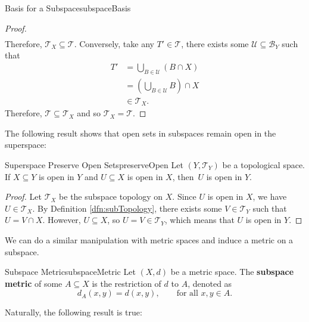 \documentclass[math]{amznotes}
\theoremstyle{remark}
\begin{document}
\begin{probox}{Basis for a Subspace}{subspaceBasis}
\begin{proof}
\begin{align*}
        \end{align*}
        Therefore, $\mathcal{T}_X \subseteq \mathcal{T}$. Conversely, take any $T' \in \mathcal{T}$, there exists some $\mathcal{U} \subseteq \mathcal{B}_Y$ such that
        \begin{align*}
            T' & = \bigcup_{B \in \mathcal{U}}\left(B \cap X\right) \\
            & = \left(\bigcup_{B \in \mathcal{U}}B\right) \cap X \\
            & \in \mathcal{T}_X.
        \end{align*}
        Therefore, $\mathcal{T} \subseteq \mathcal{T}_X$ and so $\mathcal{T}_X = \mathcal{T}$.
    \end{proof}
\end{probox}
The following result shows that open sets in subspaces remain open in the superspace:
\begin{probox}{Superspace Preserve Open Sets}{preserveOpen}
    Let $\left(Y, \mathcal{T}_Y\right)$ be a topological space. If $X \subseteq Y$ is open in $Y$ and $U \subseteq X$ is open in $X$, then~$U$ is open in $Y$.
    \tcblower
    \begin{proof}
        Let $\mathcal{T}_X$ be the subspace topology on $X$. Since $U$ is open in $X$, we have $U \in \mathcal{T}_X$. By Definition \ref{dfn:subTopology}, there exists some $V \in \mathcal{T}_Y$ such that $U = V \cap X$. However, $U \subseteq X$, so $U = V \in \mathcal{T}_Y$, which means that $U$ is open in $Y$.
    \end{proof}
\end{probox}
We can do a similar manipulation with metric spaces and induce a metric on a subspace.
\begin{dfnbox}{Subspace Metric}{subspaceMetric}
    Let $\left(X, d\right)$ be a metric space. The {\color{red} \textbf{subspace metric}} of some $A \subseteq X$ is the restriction of $d$ to $A$, denoted as 
    \begin{equation*}
        d_A\left(x, y\right) = d\left(x, y\right), \qquad \textrm{for all } x, y \in A.
    \end{equation*}
\end{dfnbox}
Naturally, the following result is true:
\end{document}
